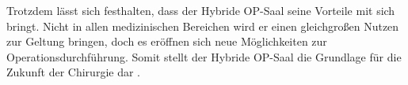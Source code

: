 Trotzdem lässt sich festhalten, dass der Hybride OP-Saal seine Vorteile mit sich bringt. Nicht in allen medizinischen Bereichen wird er einen gleichgroßen Nutzen zur Geltung bringen, doch es eröffnen sich neue Möglichkeiten zur Operationsdurchführung. Somit stellt der Hybride OP-Saal die Grundlage für die Zukunft der Chirurgie dar \cite{ORofTheFuture}.





 





